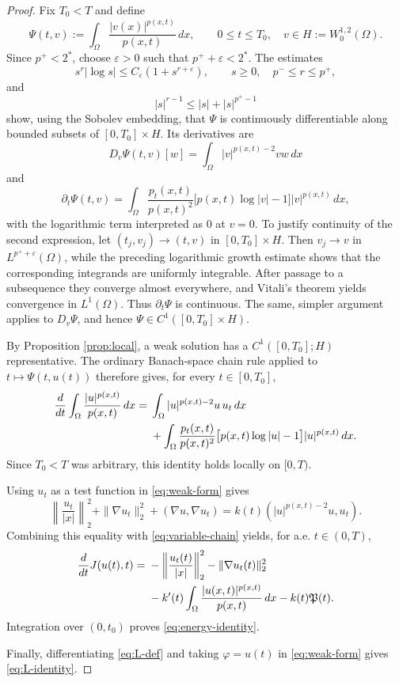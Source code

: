 \documentclass[12pt,reqno]{amsart}
\theoremstyle{definition}
\theoremstyle{remark}
\numberwithin{equation}{section}
\begin{document}
\begin{proof}
Fix $T_0<T$ and define
\[
\Psi(t,v):=\int_\Omega\frac{|v(x)|^{p(x,t)}}{p(x,t)}\,dx,
\qquad 0\le t\le T_0,\quad v\in H:=W^{1,2}_0(\Omega).
\]
Since $p^+<2^*$, choose $\varepsilon>0$ such that $p^++\varepsilon<2^*$. The estimates
\[
s^r|\log s|\le C_\varepsilon(1+s^{r+\varepsilon}),
\qquad s\ge0,\quad p^-\le r\le p^+,
\]
and
\[
|s|^{r-1}\le |s|+|s|^{p^+-1}
\]
show, using the Sobolev embedding, that $\Psi$ is continuously differentiable along bounded subsets of $[0,T_0]\times H$. Its derivatives are
\[
D_v\Psi(t,v)[w]
=\int_\Omega |v|^{p(x,t)-2}vw\,dx
\]
and
\[
\partial_t\Psi(t,v)
=\int_\Omega\frac{p_t(x,t)}{p(x,t)^2}
\bigl[p(x,t)\log|v|-1\bigr]|v|^{p(x,t)}\,dx,
\]
with the logarithmic term interpreted as $0$ at $v=0$. To justify continuity of the second expression, let $(t_j,v_j)\to(t,v)$ in $[0,T_0]\times H$. Then $v_j\to v$ in $L^{p^++\varepsilon}(\Omega)$, while the preceding logarithmic growth estimate shows that the corresponding integrands are uniformly integrable. After passage to a subsequence they converge almost everywhere, and Vitali's theorem yields convergence in $L^1(\Omega)$. Thus $\partial_t\Psi$ is continuous. The same, simpler argument applies to $D_v\Psi$, and hence $\Psi\in C^1([0,T_0]\times H)$.

By Proposition \ref{prop:local}, a weak solution has a $C^1([0,T_0];H)$ representative. The ordinary Banach-space chain rule applied to $t\mapsto\Psi(t,u(t))$ therefore gives, for every $t\in[0,T_0]$,
\begin{align}
\frac{d}{dt}\int_\Omega\frac{|u|^{p(x,t)}}{p(x,t)}\,dx
={}&\int_\Omega |u|^{p(x,t)-2}u\,u_t\,dx \notag\\
&+\int_\Omega\frac{p_t(x,t)}{p(x,t)^2}
\bigl[p(x,t)\log|u|-1\bigr]|u|^{p(x,t)}\,dx.             \label{eq:variable-chain}
\end{align}
Since $T_0<T$ was arbitrary, this identity holds locally on $[0,T)$.

Using $u_t$ as a test function in \eqref{eq:weak-form} gives
\[
\left\|\frac{u_t}{|x|}\right\|_2^2
+\|\nabla u_t\|_2^2
+(\nabla u,\nabla u_t)
=k(t)(|u|^{p(x,t)-2}u,u_t).
\]
Combining this equality with \eqref{eq:variable-chain} yields, for a.e. $t\in(0,T)$,
\begin{align*}
\frac{d}{dt}J(u(t),t)
={}&-\left\|\frac{u_t(t)}{|x|}\right\|_2^2
-\|\nabla u_t(t)\|_2^2 \notag\\
&-k'(t)\int_\Omega\frac{|u(x,t)|^{p(x,t)}}{p(x,t)}\,dx
-k(t)\mathfrak P(t).
\end{align*}
Integration over $(0,t_0)$ proves \eqref{eq:energy-identity}.

Finally, differentiating \eqref{eq:L-def} and taking $\varphi=u(t)$ in \eqref{eq:weak-form} gives \eqref{eq:L-identity}.
\end{proof}
\end{document}
